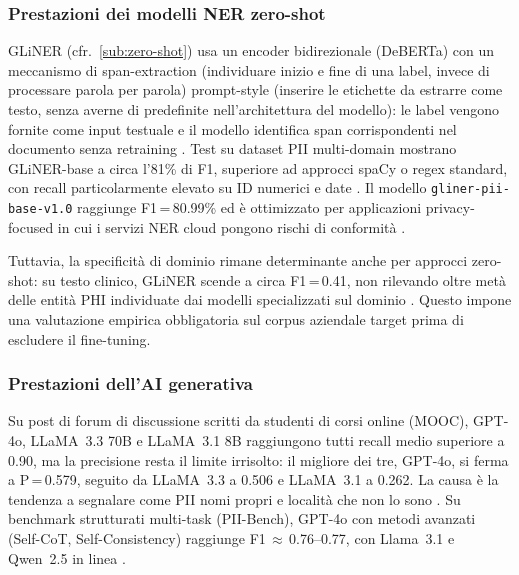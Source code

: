 \subsubsection*{Prestazioni dei modelli NER zero-shot}

GLiNER (cfr.~\ref{sub:zero-shot}) usa un encoder bidirezionale (DeBERTa) con un meccanismo di span-extraction (individuare inizio e fine di una label, invece di processare parola per parola) prompt-style (inserire le etichette da estrarre come testo, senza averne di predefinite nell'architettura del modello): le label vengono fornite come input testuale e il modello identifica span corrispondenti nel documento senza retraining
\cite{zaratianaGLiNERGeneralistModel2024}. %
Test su dataset PII multi-domain mostrano GLiNER-base a circa l'81\% di F1, superiore ad approcci spaCy o regex standard, con recall particolarmente elevato su ID numerici e date
\cite{ComparingBestNERProtecto2025}. %
Il modello \texttt{gliner-pii-base-v1.0} raggiunge F1\,=\,80.99\% ed è ottimizzato per applicazioni privacy-focused in cui i servizi NER cloud pongono rischi di conformità
\cite{KnowledgatorGlinerpiibasev10HuggingFace2026}. %

Tuttavia, la specificità di dominio rimane determinante anche per approcci zero-shot: su testo clinico, GLiNER scende a circa F1\,=\,0.41, non rilevando oltre metà delle entità PHI individuate dai modelli specializzati sul dominio
\cite{OpenSourcePHI}. %
Questo impone una valutazione empirica obbligatoria sul corpus aziendale target prima di escludere il fine-tuning.

\subsubsection*{Prestazioni dell'AI generativa}

Su post di forum di discussione scritti da studenti di corsi online (MOOC), GPT-4o, LLaMA~3.3 70B e LLaMA~3.1 8B raggiungono tutti recall medio superiore a 0.90, ma la precisione resta il limite irrisolto: il migliore dei tre, GPT-4o, si ferma a P\,=\,0.579, seguito da LLaMA~3.3 a 0.506 e LLaMA~3.1 a 0.262. La causa è la tendenza a segnalare come PII nomi propri e località che non lo sono
\cite{zambranoDeidentifyingStudentPersonally2025}. %
Su benchmark strutturati multi-task (PII-Bench), GPT-4o con metodi avanzati (Self-CoT, Self-Consistency) raggiunge F1\,$\approx$\,0.76--0.77, con Llama~3.1 e Qwen~2.5 in linea
\cite{shenPIIBenchEvaluatingQueryAware2026}. %

